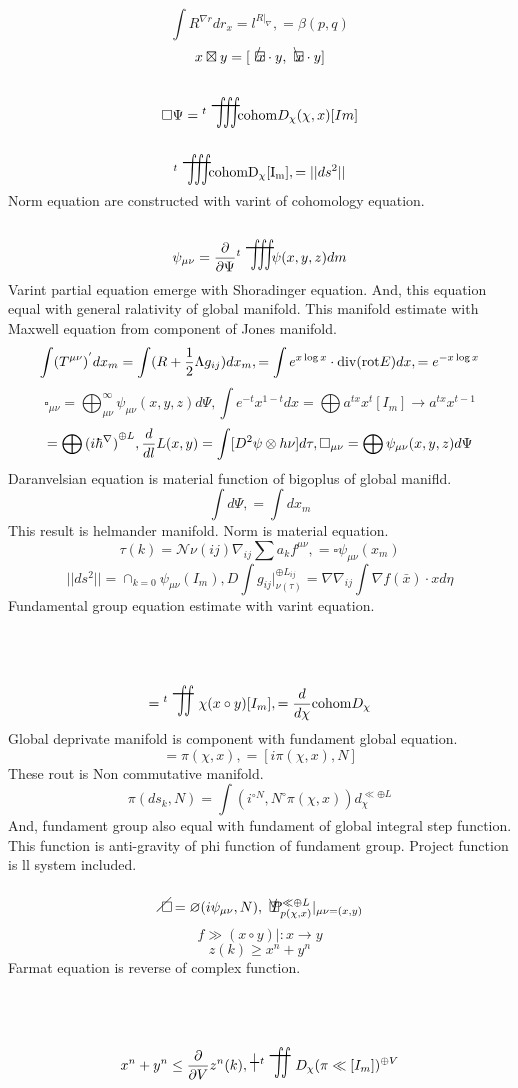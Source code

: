 \documentclass{jsarticle}
\begin{document}
  $$ \int R^{\nabla r}dr_x = l^{R|_{\nabla}}, 
   = \beta(p,q) $$
  $$ x \boxtimes y = [\average x\cdot y, \averagesqrt x \cdot y] $$
	 $$ \square \Psi = {}^{t}\scalebox{1}[2]{\variiint}
	 \mathrm{cohom}D_{\chi}(\chi,x)[Im] $$
$$ {}^{t}\scalebox{1}[2]{\variiint}\mathrm{cohom D_{\chi}[I_m]}, 
 = ||ds^2|| $$
 Norm equation are constructed with varint of cohomology equation.
$$ \mathcal{\psi}_{\mu\nu} = {\partial \over {\partial \Psi}} {}^{t}
 \scalebox{1}[2]{\variiint} \mathcal{\psi}(x,y,z)dm $$
 Varint partial equation emerge with Shoradinger equation.
  And, this equation equal with general ralativity of global manifold.
 This manifold estimate with Maxwell equation from component of Jones manifold.
 $$ \int (T^{\mu\nu})^{'}dx_m = \int (R + {1 \over 2}\Lambda g_{ij})dx_m, 
 = \int e^{x\log x}\cdot \mathrm{div}(\mathrm{rot} E)dx, 
  = e^{-x \log x} $$
 $$ \square_{\mu\nu} = \bigoplus^{\infty}_{\mu\nu} \mathcal{\psi}_{\mu\nu}
 (x,y,z)d\Psi, 
  \int e^{-t}x^{1 - t}dx = \bigoplus a^{tx}x^{t}[I_m] \to a^{tx}x^{t -1} $$
 $$ = \bigoplus {(i \hbar^{\nabla})}^{\oplus L}, 
  {d \over {d l}}L(x,y) = \int [D^2 \psi \otimes h\nu]d \tau, 
  \square_{\mu\nu} = \bigoplus \mathcal{\psi}_{\mu\nu}(x,y,z)d\Psi $$
  Daranvelsian equation is material function of bigoplus of global manifld.
 $$ \int d\Psi, 
  = \int dx_m $$
  This result is helmander manifold.
 Norm is material equation.
 $$ \tau(k) = \mathcal{N}\nu(ij) \nabla_{ij}\sum a_k f^{\mu\nu}, 
  = \square \mathcal{\psi}_{\mu\nu}(x_m) $$
 $$ ||ds^2|| = \cap_{k=0}\mathcal{\psi}_{\mu\nu}(I_m), 
  D\int g_{ij}|^{\oplus L_{ij}}_{\nu(\tau)} = \nabla \nabla_{ij}\int 
 \nabla f(\bar{x})\cdot x d\eta $$
 Fundamental group equation estimate with varint equation.
 $$ = {}^{t}\scalebox{1}[2]{\variint}\chi(x\circ y)[I_m], 
  = {d \over {d \chi}}\mathrm{cohom}D_{\chi} $$
  Global deprivate manifold is component with fundament global equation.
 $$ = \pi(\chi,x), 
  = [i\pi(\chi,x),N] $$
  These rout is Non commutative manifold.
 $$ \pi(ds_k,N) = \int (i^{\circ N},N^{\circ}\pi(\chi,x))d_{\chi}^{\ll
 \oplus L} $$
 And, fundament group also equal with fundament of global
 integral step function.
  This function is anti-gravity of phi function of fundament group.
Project function is ll system included.
  $$ \alearletter = \varnothing(i\mathcal{\psi}_{\mu\nu},N),  
   \letter {P^{\ll \oplus L}_{p(\chi,x)}}|_{{\mu\nu}=(x,y)} $$
  $$ f \gg (x \circ y) |:x \to y $$
  $$ z(k) \ge x^n + y^n $$
  Farmat equation is reverse of complex function.
  $$ x^n + y^n \le {\partial \over {\partial V}}z^n(k), 
   \scalebox{1}[2]{+} {}^{t}\scalebox{1}[2]{\variint}D_{\chi}
  (\pi \ll [I_m])^{\oplus V} $$
\end{document}
